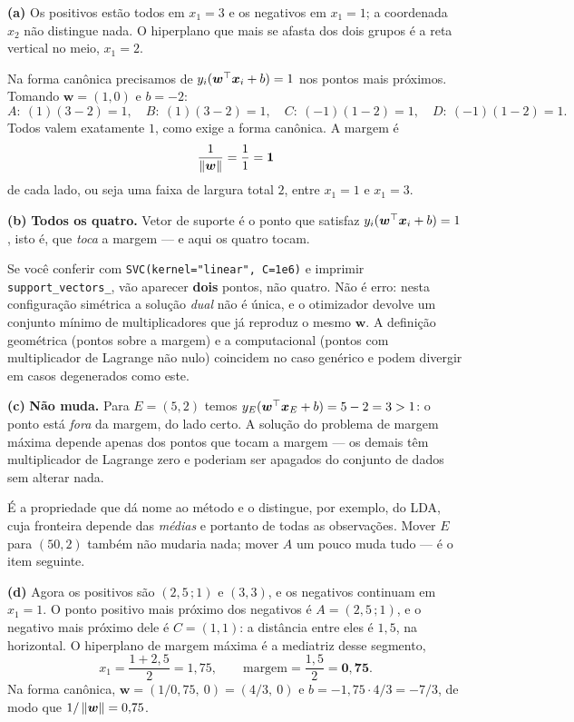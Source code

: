 \documentclass[11pt,a4paper]{article}
\begin{document}
\begin{solucao}
\textbf{(a)} Os positivos estão todos em $x_1=3$ e os negativos em $x_1=1$; a
coordenada $x_2$ não distingue nada. O hiperplano que mais se afasta dos dois
grupos é a reta vertical no meio, $x_1=2$.

Na forma canônica precisamos de $y_i(\bm w^\top\bm{x}_i+b)=1$ nos pontos mais
próximos. Tomando $\bm w=(1,0)$ e $b=-2$:
\[
  A:\ (1)(3-2)=1,\quad B:\ (1)(3-2)=1,\quad
  C:\ (-1)(1-2)=1,\quad D:\ (-1)(1-2)=1 .
\]
Todos valem exatamente $1$, como exige a forma canônica. A margem é
\[
  \frac{1}{\left\lVert \bm w \right\rVert} = \frac{1}{1} = \mathbf{1}
\]
de cada lado, ou seja uma faixa de largura total $2$, entre $x_1=1$ e $x_1=3$.

\smallskip
\textbf{(b)} \textbf{Todos os quatro.} Vetor de suporte é o ponto que satisfaz
$y_i(\bm w^\top\bm{x}_i+b)=1$, isto é, que \emph{toca} a margem --- e aqui os quatro
tocam.

\begin{atencao}
Se você conferir com \texttt{SVC(kernel="linear", C=1e6)} e imprimir
\texttt{support\_vectors\_}, vão aparecer \textbf{dois} pontos, não quatro. Não é
erro: nesta configuração simétrica a solução \emph{dual} não é única, e o
otimizador devolve um conjunto mínimo de multiplicadores que já reproduz o mesmo
$\bm w$. A definição geométrica (pontos sobre a margem) e a computacional
(pontos com multiplicador de Lagrange não nulo) coincidem no caso genérico e
podem divergir em casos degenerados como este.
\end{atencao}

\smallskip
\textbf{(c)} \textbf{Não muda.} Para $E=(5,2)$ temos
$y_E(\bm w^\top\bm{x}_E+b) = 5-2 = 3 > 1$: o ponto está \emph{fora} da margem, do
lado certo. A solução do problema de margem máxima depende apenas dos pontos que
tocam a margem --- os demais têm multiplicador de Lagrange zero e poderiam ser
apagados do conjunto de dados sem alterar nada.

É a propriedade que dá nome ao método e o distingue, por exemplo, do LDA, cuja
fronteira depende das \emph{médias} e portanto de todas as observações. Mover $E$
para $(50,2)$ também não mudaria nada; mover $A$ um pouco muda tudo --- é o item
seguinte.

\smallskip
\textbf{(d)} Agora os positivos são $(2{,}5\,;1)$ e $(3,3)$, e os negativos
continuam em $x_1=1$. O ponto positivo mais próximo dos negativos é
$A=(2{,}5\,;1)$, e o negativo mais próximo dele é $C=(1,1)$: a distância entre
eles é $1{,}5$, na horizontal. O hiperplano de margem máxima é a mediatriz desse
segmento,
\[
  x_1 = \frac{1+2{,}5}{2} = 1{,}75,
  \qquad\text{margem} = \frac{1{,}5}{2} = \mathbf{0{,}75}.
\]
Na forma canônica, $\bm w = (1/0{,}75,\ 0) = (4/3,\ 0)$ e
$b = -1{,}75\cdot 4/3 = -7/3$, de modo que $1/\left\lVert \bm w \right\rVert = 0{,}75$.


\end{solucao}
\end{document}
